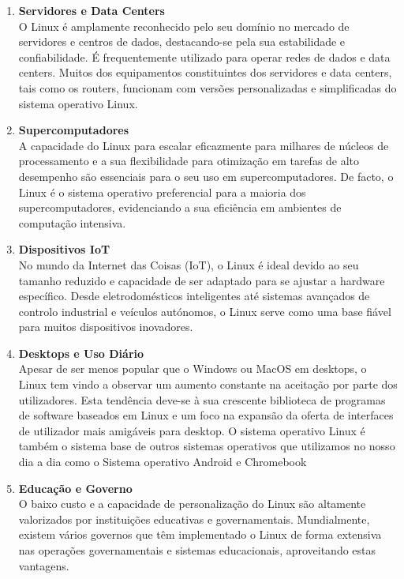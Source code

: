 \begin{enumerate}
    \item \textbf{Servidores e Data Centers}\\
    O Linux é amplamente reconhecido pelo seu domínio no mercado de servidores e centros de dados, destacando-se pela sua estabilidade e confiabilidade. É frequentemente utilizado para operar redes de dados
    e data centers.
    Muitos dos equipamentos constituintes dos servidores e data centers, tais como os routers, funcionam com versões personalizadas e simplificadas do sistema operativo Linux.

    \item \textbf{Supercomputadores}\\
    A capacidade do Linux para escalar eficazmente para milhares de núcleos de processamento e a sua flexibilidade para otimização em tarefas de alto desempenho são essenciais para o seu uso em supercomputadores. 
    De facto, o Linux é o sistema operativo preferencial para a maioria dos supercomputadores, evidenciando a sua eficiência em ambientes de computação intensiva.

    \item \textbf{Dispositivos IoT}\\
    No mundo da Internet das Coisas (IoT), o Linux é ideal devido ao seu tamanho reduzido e capacidade de ser adaptado para se ajustar a hardware específico. 
    Desde eletrodomésticos inteligentes até sistemas avançados de controlo industrial e veículos autónomos, o Linux serve como uma base fiável para muitos dispositivos inovadores.
    
    \item \textbf{Desktops e Uso Diário}\\
    Apesar de ser menos popular que o Windows ou MacOS em desktops, o Linux tem vindo a observar um aumento constante na aceitação por parte dos utilizadores. Esta tendência deve-se à sua crescente biblioteca
    de programas de software baseados em Linux e um foco na expansão da oferta de interfaces de utilizador mais amigáveis para desktop.
    O sistema operativo Linux é também o sistema base de outros sistemas operativos que utilizamos no nosso dia a dia como o Sistema operativo Android e Chromebook

    \item \textbf{Educação e Governo}\\
    O baixo custo e a capacidade de personalização do Linux são altamente valorizados por instituições educativas e governamentais. Mundialmente, existem vários governos que têm implementado o Linux de forma
    extensiva nas operações governamentais e sistemas educacionais, aproveitando estas vantagens.
    
\end{enumerate}